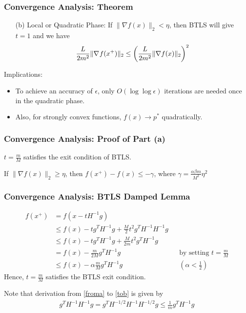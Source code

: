 \documentclass{beamer}
\newcommand{\be}{\begin{eqnarray}}
\newcommand{\ee}{\end{eqnarray}}
\newcommand{\n}{\nonumber}
\begin{document}
\begin{frame}
    \frametitle{Convergence Analysis: Theorem}    
    \begin{theorem}[Part II]
        \begin{itemize}
            \item[(b)] Local or Quadratic Phase: If $\|\nabla f(x)\|_2 < \eta$,
                then BTLS will give $t = 1$ and we have
                \be
                \frac{L}{2m^2} \|\gradient{}{f}{x^{+}}\|_2 \leq 
                    \bigg(\frac{L}{2m^2} \|\nabla f(x)\|_2 \bigg)^2
                \ee
        \end{itemize}
    \end{theorem}
    Implications:
    \begin{itemize}
    \item To achieve an accuracy of $\epsilon$, only $O(\log \log \epsilon)$ iterations are needed once in the quadratic phase.
    \item Also, for strongly convex functions, $f(x) \to p^{*}$ quadratically.
    \end{itemize}
\end{frame}

\begin{frame}
    \frametitle{Convergence Analysis: Proof of Part (a)}    
    \begin{lemma}
        $t = \frac{m}{M}$ satisfies the exit condition of BTLS.
    \end{lemma}
    \begin{lemma}
        If $\|\nabla f(x)\|_2 \geq \eta$, 
        then $f(x^{+}) - f(x) \leq -\gamma$, 
        where  $\gamma = \frac{\alpha \beta m}{M^2}\eta^2$
    \end{lemma}
\end{frame}

\begin{frame}
    \frametitle{Convergence Analysis: BTLS Damped Lemma}    
\begin{align}
f(x^{+}) & = f(x-tH^{-1}g) \n \\
& \le f(x) - tg^TH^{-1}g + \frac{M}{2}t^2g^TH^{-1}H^{-1}g \label{froma} \\
& \le f(x) - tg^TH^{-1}g + \frac{M}{2m}t^2 g^T H^{-1}g \label{tob}\\
& = f(x) -  \frac{m}{2M} g^T H^{-1}g  &&
    \text{by setting $t=\frac{m}{M}$} \n \\
    & \le f(x) - \alpha \frac{m}{M} g^T H^{-1}g && (\alpha < \frac{1}{2})
\end{align}
Hence, $t = \frac{m}{M}$ satisfies the BTLS exit condition.

Note that derivation from \eqref{froma} to \eqref{tob} is given by
\be
g^TH^{-1}H^{-1}g = g^TH^{-1/2}H^{-1}H^{-1/2}g \le \frac{1}{m} g^T H^{-1}g \n
\ee

\end{frame}
\end{document}
